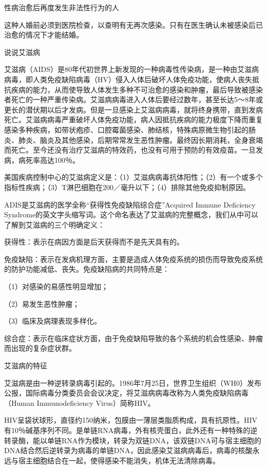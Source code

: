 \documentclass[12pt,UTF8,openany]{ctexbook}
\begin{document}
性病治愈后再度发生非法性行为的人

这种人婚前必须到医院检查，以查明有无再次感染。只有在医生确认未被感染后已治愈的情况下才能结婚。





说说艾滋病


艾滋病（AIDS）是80年代初世界上新发现的一种病毒性传染病，是一种由艾滋病病毒，即人类免疫缺陷病毒（HV）侵入人体后破坏人体免疫功能，使病人丧失抵抗疾病的能力，从而使导致人体发生多种不可治愈的感染和肿瘤，最后导致被感染者死亡的一种严重传染病。艾滋病病毒进入人体后要经过数年，甚至长达5～8年或更长的潜伏期以后才发病。但是一旦感染上艾滋病病毒，就将终身携带，直到发病死亡。艾滋病病毒严重破坏人体免疫功能，病人因抵抗疾病的能力极度下降而重复感染多种疾病，如带状疱疹、口腔霉菌感染、肺结核，特殊病原微生物引起的肠炎、肺炎、脑炎及其他感染，后期常常发生恶性肿瘤。最终因长期消耗，全身衰竭而死亡。至今还没有治疗艾滋病的特效药，也没有可用于预防的有效疫苗。一旦发病，病死率高达100％。

美国疾病控制中心的艾滋病定义是：（1）艾滋病病毒抗体阳性；（2）有一个或多个指标性疾病；（3）T淋巴细胞在200／毫升以下；（4）排除其他免疫抑制原因。

ADIS是艾滋病的医学全称“获得性免疫缺陷综合症”Acquired Immune Deficiency Syndrome的英文字头缩写词。这个命名表达了艾滋病的完整概念，我们从中可以了解到艾滋病的三个明确定义：

获得性：表示在病因方面是后天获得而不是先天具有的。

免疫缺陷：表示在发病机理方面，主要是造成人体免疫系统的损伤而导致免疫系统的防护功能减低、丧失。免疫缺陷病的共同特点是：

（1）对感染的易感性明显增加；

（2）易发生恶性肿瘤；

（3）临床及病理表现多样化。

综合症：表示在临床症状方面，由于免疫缺陷导致的各个系统的机会性感染、肿瘤而出现的复杂症状群。





艾滋病的特征


艾滋病是由一种逆转录病毒引起的。1986年7月25日，世界卫生组织（WH0）发布公报，国际病毒分类委员会会议决定，将艾滋病病毒改称为人类免疫缺陷病毒（Human Immunodeficiency Virus）简称HIV。

HIV呈袋状球形，直径约150纳米，包膜由一薄层类脂质构成，具有抗原性。HIV有10％碱基序列不同。是单链RNA病毒，外有核壳蛋白，此外还有一种特殊的逆转录酶，能以单链RNA作为模块，转录为双链DNA，该双链DNA可与宿主细胞的DNA结合然后逆转录为病毒的单链DNA，因此感染艾滋病病毒后，病毒的核酸永远与宿主细胞结合在一起，使得感染不能消失，机体无法清除病毒。
\end{document}
